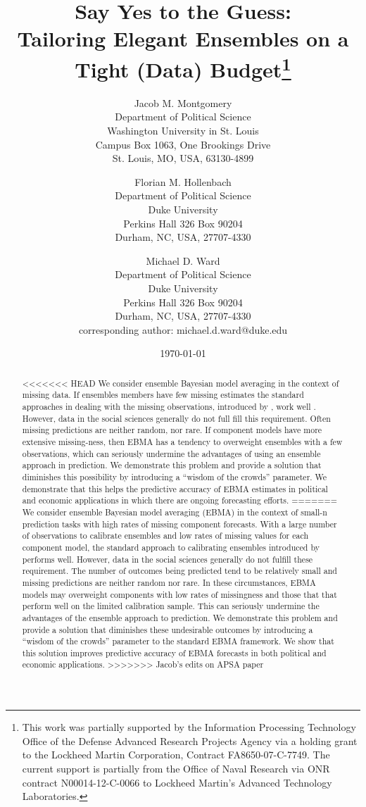 \documentclass[12pt,fullpage,endnotes]{article}
\title{Say Yes to the Guess: \\ Tailoring Elegant Ensembles on a Tight
  (Data) Budget\thanks{This work was partially supported by the Information Processing Technology Office of the Defense Advanced Research Projects Agency via a holding grant to the Lockheed Martin Corporation, Contract FA8650-07-C-7749. The current support is partially from the Office of Naval Research via ONR contract N00014-12-C-0066 to Lockheed Martin's Advanced Technology Laboratories.
    }}
\author{
Jacob M. Montgomery\\
	Department of Political Science\\
	Washington University in St. Louis\\
	Campus Box 1063, One Brookings Drive\\
	St. Louis, MO, USA, 63130-4899 
	\and
Florian M. Hollenbach  \\
	Department of Political Science\\
	Duke University\\
	Perkins Hall 326 Box 90204\\
	Durham, NC, USA, 27707-4330
	\and
Michael D. Ward\\
	Department of Political Science\\
	Duke University\\
	Perkins Hall 326 Box 90204\\
	Durham, NC, USA, 27707-4330\\
	corresponding author: michael.d.ward@duke.edu
}
\date{\today}
\begin{document}
\maketitle
\thispagestyle{empty}
\clearpage
\pagestyle{myheadings}
\newpage

\thispagestyle{empty}


\begin{abstract}
<<<<<<< HEAD
We consider ensemble Bayesian model averaging in the context of missing data.  If ensembles members have few missing estimates the standard approaches in dealing with the missing observations, introduced by \citet{Fraley:2010}, work well . However, data in the social sciences generally do not full fill this requirement. Often missing predictions are neither random, nor rare. If component models have more extensive missing-ness, then EBMA has a tendency to overweight ensembles with a few observations, which can seriously undermine the advantages of using an ensemble approach in prediction.  We demonstrate this problem and provide a solution that diminishes this possibility by introducing a ``wisdom of the crowds'' parameter. We demonstrate that this helps the predictive accuracy of EBMA estimates in political and economic applications in which there are ongoing forecasting efforts.
=======
  \noindent We consider ensemble Bayesian model averaging (EBMA) in
  the context of small-n prediction tasks with high rates of missing
  component forecasts.  With a large number of observations to
  calibrate ensembles and low rates of missing values for each
  component model, the standard approach to calibrating ensembles
  introduced by \cite{Raftery:2005} performs well. However, data in
  the social sciences generally do not fulfill these requirement. The
  number of outcomes being predicted tend to be relatively small and
  missing predictions are neither random nor rare. In these
  circumstances, EBMA models may overweight components with low rates
  of missingness and those that that perform well on the limited
  calibration sample.  This can seriously undermine the advantages of
  the ensemble approach to prediction.  We demonstrate this problem
  and provide a solution that diminishes these undesirable outcomes by
  introducing a ``wisdom of the crowds'' parameter to the standard
  EBMA framework. We show that this solution improves predictive
  accuracy of EBMA forecasts in both political and economic
  applications.
>>>>>>> Jacob's edits on APSA paper
\end{abstract}
\end{document}
